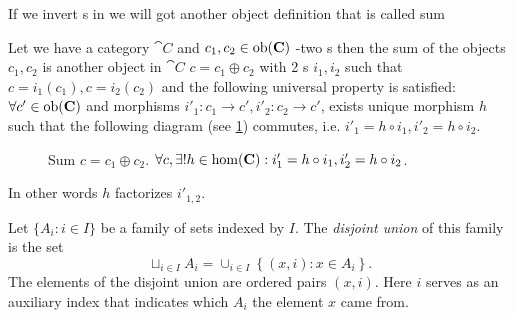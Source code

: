 If we invert s in  we will
got another 
object definition that is called sum

\begin{definition}[Sum]
\label{def:sum}
Let we have a category $\cat{C}$ and $c_1, c_2 \in \mathrm{ob}(\mathbf{C})$ -two
s then the sum of the objects $c_1, c_2$ is
another object in $\cat{C}$ $c = c_1 \oplus c_2$ with 2
s $i_1, i_2$ such that $c = i_1(c_1), c = i_2
(c_2)$ and the 
following universal property is satisfied: $\forall c' \in \mathrm{ob}(\mathbf{C})$
and morphisms $i'_1: c_1 \to c', i'_2: c_2 \to c'$, exists unique
morphism $h$ such that the following diagram (see \cref{fig:sum})
commutes, i.e. $i'_1 = h \circ i_1, i'_2 = h \circ i_2$.
\begin{figure}[H]
  \centering
  \caption{Sum $c = c_1 \oplus c_2$. $\forall c, \exists! h \in
    \mathrm{hom}(\mathbf{C}): i'_1 = h \circ i_1, i'_2 = h \circ i_2 $.}
  \label{fig:sum}
\end{figure}
In other words $h$ factorizes $i'_{1,2}$.
\end{definition}

\begin{definition}
  \label{def:disjoint_union}
  Let $\{A_i: i \in I\}$ be a family of sets 
  indexed by $I$. The 
  \textit{disjoint union} \cite{wiki:disjointunion} of this family is
  the set 
  \[
  \sqcup_{i \in I} A_i = \cup_{i \in I}\left\{
  \left(x, i\right): x \in A_i
  \right\}.
  \]
  The elements of the disjoint union are ordered pairs $(x, i)$. Here $i$
  serves as an auxiliary index that indicates which $A_i$ the element $x$
  came from.
\end{definition}

